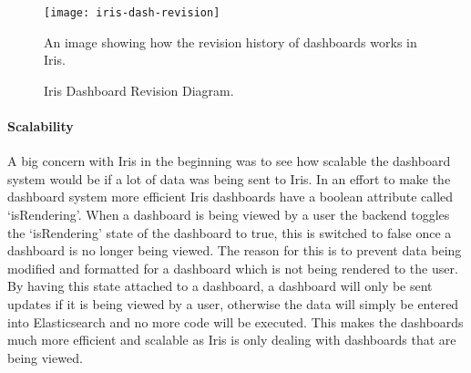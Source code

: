 \documentclass[12pt,a4paper,titlepage]{report}
\begin{document}
\begin{figure}[H]
\begin{tcolorbox}
\begin{center}
\texttt{[image: iris-dash-revision]}
\end{center}
An image showing how the revision history of dashboards works in Iris.
\end{tcolorbox}
\caption{Iris Dashboard Revision Diagram.}
\end{figure}

\paragraph{Scalability}
A big concern with Iris in the beginning was to see how scalable the dashboard system would be if a lot of data was being sent to Iris. In an effort to make the dashboard system more efficient Iris dashboards have a boolean attribute called `isRendering'. When a dashboard is being viewed by a user the backend toggles the `isRendering' state of the dashboard to true, this is switched to false once a dashboard is no longer being viewed. The reason for this is to prevent data being modified and formatted for a dashboard which is not being rendered to the user. By having this state attached to a dashboard, a dashboard will only be sent updates if it is being viewed by a user, otherwise the data will simply be entered into Elasticsearch and no more code will be executed. This makes the dashboards much more efficient and scalable as Iris is only dealing with dashboards that are being viewed.



\end{document}
